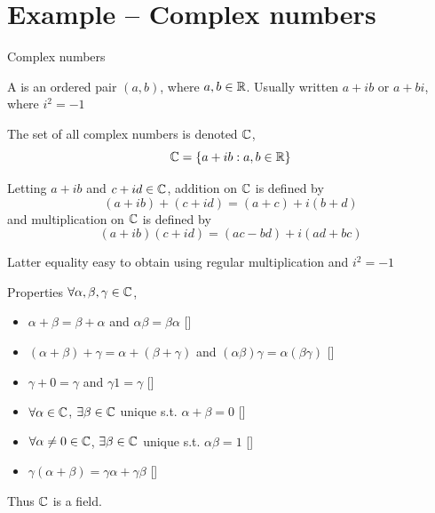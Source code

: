 \documentclass[aspectratio=169]{beamer}
\begin{document}
\section{Example -- Complex numbers}

\begin{frame}{Complex numbers}
\begin{definition}
A  is an ordered pair $(a,b)$, where $a,b\in\mathbb{R}$. Usually written $a+ib$ or $a+bi$, where $i^2=-1$

The set of all complex numbers is denoted $\mathbb{C}$, 
\[
\mathbb{C}=\{a+ib: a,b\in\mathbb{R}\}
\]
\end{definition}
\end{frame}

\begin{frame}
\begin{definition}
Letting $a+ib$ and $c+id\in\mathbb{C}$, addition on $\mathbb{C}$ is defined by
\[
(a+ib)+(c+id) = (a+c)+i(b+d)
\]
and multiplication on $\mathbb{C}$ is defined by
\[
(a+ib)(c+id) = (ac-bd)+i(ad+bc)
\]
\end{definition}
Latter equality easy to obtain using regular multiplication and $i^2=-1$
\end{frame}

\begin{frame}{Properties}
$\forall\alpha,\beta,\gamma\in\mathbb{C}$,
\begin{itemize}
\item $\alpha+\beta=\beta+\alpha$ and $\alpha\beta=\beta\alpha$ \hfill[]
\item $(\alpha+\beta)+\gamma=\alpha+(\beta+\gamma)$ and $(\alpha\beta)\gamma=\alpha(\beta\gamma)$ \hfill[]
\item $\gamma+0=\gamma$ and $\gamma 1=\gamma$ \hfill[]
\item $\forall\alpha\in\mathbb{C}$, $\exists\beta\in\mathbb{C}$ unique s.t. $\alpha+\beta=0$ \hfill[]
\item $\forall \alpha\neq 0\in\mathbb{C}$, $\exists\beta\in\mathbb{C}$ unique s.t. $\alpha\beta=1$ \hfill[]
\item $\gamma(\alpha+\beta)=\gamma\alpha+\gamma\beta$ \hfill[]
\end{itemize}
Thus $\mathbb{C}$ is a field.
\end{frame}
\end{document}
